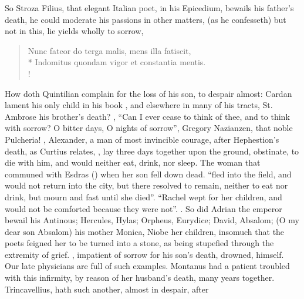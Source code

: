 So Stroza Filius, that elegant Italian poet, in his Epicedium, bewails his
father's death, he could moderate his passions in other matters, (as he
confesseth) but not in this, lie yields wholly to sorrow,

\begin{latin}
\begin{verse}%
Nunc fateor do terga malis, mens illa fatiscit,\\*
Indomitus quondam vigor et constantia mentis.\\!
\end{verse}%
\end{latin}

How doth Quintilian complain for the loss of his son, to
despair almost: Cardan lament his only child in his book
, and elsewhere in many of his tracts,
St. Ambrose his brother's death? ,
\etc{} \enquote{Can I ever cease to think of thee, and to think with sorrow? O bitter
days, O nights of sorrow}, \etc{} Gregory Nazianzen, that noble Pulcheria!
, \etc{} Alexander, a man of most
invincible courage, after Hephestion's death, as Curtius relates, , lay three days together upon the ground,
obstinate, to die with him, and would neither eat, drink, nor sleep. The woman
that communed with Esdras () when her
son fell down dead. \enquote{fled into the field, and would not return into the city,
but there resolved to remain, neither to eat nor drink, but mourn and fast
until she died}. \enquote{Rachel wept for her children, and would not be comforted
because they were not}. . So did Adrian the emperor
bewail his Antinous; Hercules, Hylas; Orpheus, Eurydice; David, Absalom; (O my
dear son Absalom) \Austin{} his mother Monica, Niobe her children, insomuch that
the poets feigned her to be turned into a stone, as being
stupefied through the extremity of grief. , impatient of
sorrow for his son's death, drowned, himself. Our late physicians are full of
such examples. Montanus 
had a patient troubled with this infirmity, by reason of
her husband's death, many years together. Trincavellius,
 hath such another, almost in despair, after
